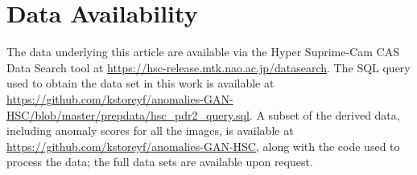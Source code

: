 \section*{Data Availability}

The data underlying this article are available via the Hyper Suprime-Cam CAS Data Search tool at \url{https://hsc-release.mtk.nao.ac.jp/datasearch}.
The SQL query used to obtain the data set in this work is available at \url{https://github.com/kstoreyf/anomalies-GAN-HSC/blob/master/prepdata/hsc_pdr2_query.sql}.
A subset of the derived data, including anomaly scores for all the images, is available at \url{https://github.com/kstoreyf/anomalies-GAN-HSC}, along with the code used to process the data; the full data sets are available upon request.



